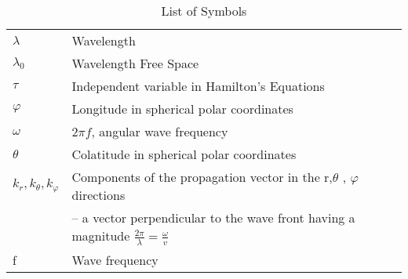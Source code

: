\documentclass[11pt]{article} %
\begin{document}
\begin{table}[]
\caption{List of Symbols}
\label{my-label}
\begin{tabular}{ll}
 
      $\lambda$                                  & Wavelength                                                                                                                                                                                                                                 \\ 
      $\lambda_0$                                & Wavelength Free Space                                                                                                                                                                                                                      \\
 $\tau$                                          & Independent variable in Hamilton's Equations                                                                                                                                                                                               \\
$\varphi$                                        & Longitude in spherical polar coordinates                                                                                                                                                                                                   \\
$\omega$                                         & $2\pi f$, angular wave frequency                                                                                                                                                                               \\
$ \theta $                                       & Colatitude in spherical polar coordinates                                                                                                                                                                                                   \\
$ k_r, k_\theta, k_\varphi $                     & Components of the propagation vector in the r,$ \theta$ , $\varphi$ directions 
\\
  & -- a vector perpendicular to the wave front having a magnitude $\frac{2 \pi}{ \lambda}=\frac{\omega}{v} $
\\
f                                                & Wave frequency                                                                                                                                                                                                                             \\

\end{tabular}
\end{table}
\end{document}

